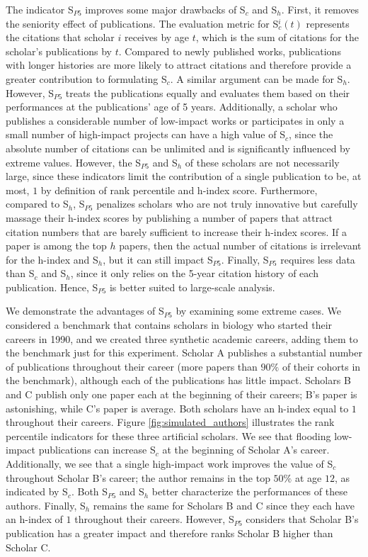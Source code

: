 The indicator S$_{P5}$ improves some major drawbacks of S$_c$ and S$_h$. First, it removes the seniority effect of publications. The evaluation metric for S$_c^{i}(t)$ represents the citations that scholar $i$ receives by age $t$, which is the sum of citations for the scholar's publications by $t$. Compared to newly published works, publications with longer histories are more likely to attract citations and therefore provide a greater contribution to formulating S$_c$. A similar argument can be made for S$_h$. However, S$_{P5}$ treats the publications equally and evaluates them based on their performances at the publications' age of 5 years. Additionally, a scholar who publishes a considerable number of low-impact works or participates in only a small number of high-impact projects can have a high value of S$_c$, since the absolute number of citations can be unlimited and is significantly influenced by extreme values. However, the S$_{P5}$ and S$_h$ of these scholars are not necessarily large, since these indicators limit the contribution of a single publication to be, at most, $1$ by definition of rank percentile and h-index score. Furthermore, compared to S$_h$, S$_{P5}$ penalizes scholars who are not truly innovative but carefully massage their h-index scores by publishing a number of papers that attract citation numbers that are barely sufficient to increase their h-index scores. If a paper is among the top $h$ papers, then the actual number of citations is irrelevant for the h-index and S$_h$, but it can still impact S$_{P5}$. Finally, S$_{P5}$ requires less data than S$_c$ and S$_h$, since it only relies on the 5-year citation history of each publication. Hence, S$_{P5}$ is better suited to large-scale analysis.

We demonstrate the advantages of S$_{P5}$ by examining some extreme cases. We considered a benchmark that contains scholars in biology who started their careers in 1990, and we created three synthetic academic careers, adding them to the benchmark just for this experiment. Scholar A publishes a substantial number of publications throughout their career (more papers than $90\%$ of their cohorts in the benchmark), although each of the publications has little impact. Scholars B and C publish only one paper each at the beginning of their careers; B's paper is astonishing, while C's paper is average. Both scholars have an h-index equal to $1$ throughout their careers. Figure \ref{fig:simulated_authors} illustrates the rank percentile indicators for these three artificial scholars. We see that flooding low-impact publications can increase S$_c$ at the beginning of Scholar A's career. Additionally, we see that a single high-impact work improves the value of S$_c$ throughout Scholar B's career; the author remains in the top $50\%$ at age $12$, as indicated by S$_c$. Both S$_{P5}$ and S$_h$ better characterize the performances of these authors. Finally, S$_h$ remains the same for Scholars B and C since they each have an h-index of $1$ throughout their careers. However, S$_{P5}$ considers that Scholar B's publication has a greater impact and therefore ranks Scholar B higher than Scholar C. 


